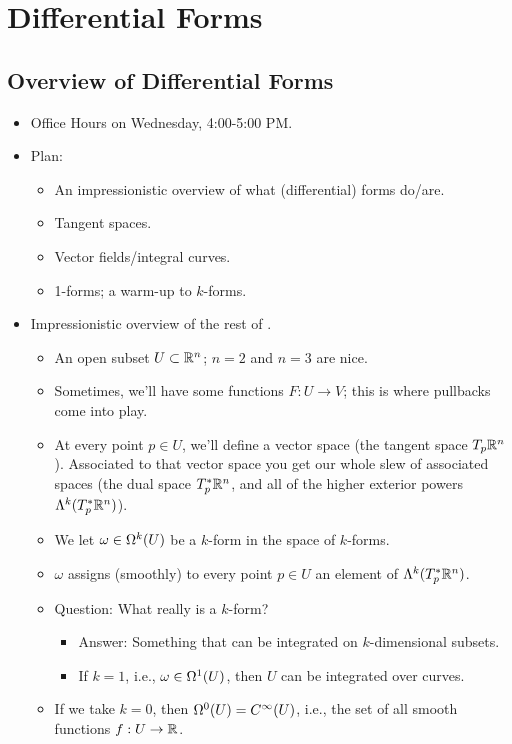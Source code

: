 \documentclass[../notes.tex]{subfiles}
\begin{document}
\chapter{Differential Forms}
\section{Overview of Differential Forms}
\begin{itemize}
    \item {}Office Hours on Wednesday, 4:00-5:00 PM.
    \item Plan:
    \begin{itemize}
        \item An impressionistic overview of what (differential) forms do/are.
        \item Tangent spaces.
        \item Vector fields/integral curves.
        \item 1-forms; a warm-up to $k$-forms.
    \end{itemize}
    \item Impressionistic overview of the rest of \textcite{bib:DifferentialForms}.
    \begin{itemize}
        \item An open subset $U\subset\R^n$; $n=2$ and $n=3$ are nice.
        \item Sometimes, we'll have some functions $F:U\to V$; this is where pullbacks come into play.
        \item At every point $p\in U$, we'll define a vector space (the tangent space $T_p\R^n$). Associated to that vector space you get our whole slew of associated spaces (the dual space $T_p^*\R^n$, and all of the higher exterior powers $\lam[k]{T_p^*\R^n}$).
        \item We let $\omega\in\ome[k]{U}$ be a $k$-form in the space of $k$-forms.
        \item $\omega$ assigns (smoothly) to every point $p\in U$ an element of $\lam[k]{T_p^*\R^n}$.
        \item Question: What really is a $k$-form?
        \begin{itemize}
            \item Answer: Something that can be integrated on $k$-dimensional subsets.
            \item If $k=1$, i.e., $\omega\in\ome[1]{U}$, then $U$ can be integrated over curves.
        \end{itemize}
        \item If we take $k=0$, then $\ome[0]{U}=C^\infty(U)$, i.e., the set of all smooth functions $f:U\to\R$.

\end{itemize}
\end{itemize}
\end{document}
